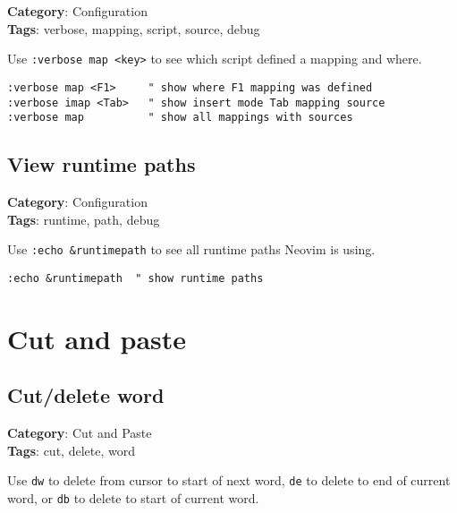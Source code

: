{{{\textbf{Category}: Configuration\\ \textbf{Tags}: verbose, mapping, script, source, debug
\vspace{0.5cm}

Use {\footnotesize \Verb§:verbose map <key>§} to see which script defined a mapping and where.

\begin{Exa*}{}
\begin{Verbatim}[fontsize=\footnotesize, breaklines, breakanywhere]
:verbose map <F1>     " show where F1 mapping was defined
:verbose imap <Tab>   " show insert mode Tab mapping source
:verbose map          " show all mappings with sources
\end{Verbatim}
\end{Exa*}

\section{View runtime paths}

\textbf{Category}: Configuration\\ \textbf{Tags}: runtime, path, debug
\vspace{0.5cm}

Use {\footnotesize \Verb§:echo &runtimepath§} to see all runtime paths Neovim is using.

\begin{Exa*}{}
\begin{Verbatim}[fontsize=\footnotesize, breaklines, breakanywhere]
:echo &runtimepath  " show runtime paths
\end{Verbatim}
\end{Exa*}

\chapter{Cut and paste}
\section{Cut/delete word}

\textbf{Category}: Cut and Paste\\ \textbf{Tags}: cut, delete, word
\vspace{0.5cm}

Use {\footnotesize \Verb§dw§} to delete from cursor to start of next word, {\footnotesize \Verb§de§} to delete to end of current word, or {\footnotesize \Verb§db§} to delete to start of current word.

}}}
